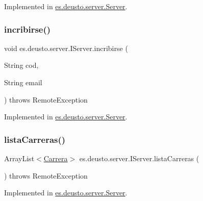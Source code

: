 Implemented in \mbox{\hyperlink{classes_1_1deusto_1_1server_1_1_server_a22d31cd9642f978f1995fc7822d99258}{es.\+deusto.\+server.\+Server}}.

\mbox{\label{interfacees_1_1deusto_1_1server_1_1_i_server_ab6f6b6b646a79a330ab0b2174d77db44}} 
\subsubsection{\texorpdfstring{incribirse()}{incribirse()}}
{\footnotesize\ttfamily void es.\+deusto.\+server.\+I\+Server.\+incribirse (\begin{DoxyParamCaption}\item[{String}]{cod,  }\item[{String}]{email }\end{DoxyParamCaption}) throws Remote\+Exception}



Implemented in \mbox{\hyperlink{classes_1_1deusto_1_1server_1_1_server_a19df52b26da7c83b2e7f13a6aab45633}{es.\+deusto.\+server.\+Server}}.

\mbox{\label{interfacees_1_1deusto_1_1server_1_1_i_server_a13c17b07c8114d16130053aecdd455bb}} 
\subsubsection{\texorpdfstring{listaCarreras()}{listaCarreras()}}
{\footnotesize\ttfamily Array\+List$<$\mbox{\hyperlink{classes_1_1deusto_1_1server_1_1jdo_1_1_carrera}{Carrera}}$>$ es.\+deusto.\+server.\+I\+Server.\+lista\+Carreras (\begin{DoxyParamCaption}{ }\end{DoxyParamCaption}) throws Remote\+Exception}



Implemented in \mbox{\hyperlink{classes_1_1deusto_1_1server_1_1_server_af62ce3462ec30a081db0009d2f2b33bb}{es.\+deusto.\+server.\+Server}}.

\mbox{\label{interfacees_1_1deusto_1_1server_1_1_i_server_af6743c655c7831fa6d87e6e910bb6db4}} 
